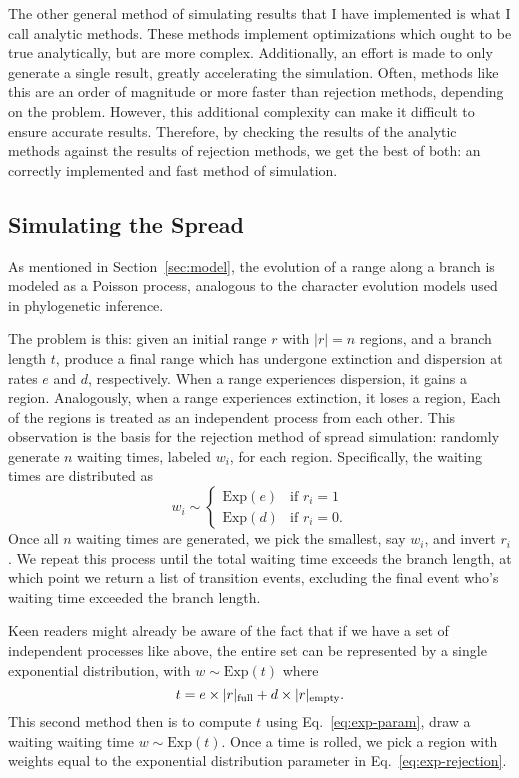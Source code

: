 \documentclass{article}
\begin{document}
The other general method of simulating results that I have implemented is what
I call analytic methods.
These methods implement optimizations which ought to be true analytically, but
are more complex.
Additionally, an effort is made to only generate a single result, greatly
accelerating the simulation.
Often, methods like this are an order of magnitude or more faster than
rejection methods, depending on the problem.
However, this additional complexity can make it difficult to ensure accurate
results.
Therefore, by checking the results of the analytic methods against the results
of rejection methods, we get the best of both: an correctly implemented and
fast method of simulation.

\subsection{Simulating the Spread}

As mentioned in Section~\ref{sec:model}, the evolution of a range along a
branch is modeled as a Poisson process, analogous to the character evolution
models used in phylogenetic inference.

The problem is this: given an initial range \( r \) with \( |r| = n \) regions,
and a branch length \( t \), produce a final range which has undergone
extinction and dispersion at rates \( e \) and \( d \), respectively.
When a range experiences dispersion, it gains a region.
Analogously, when a range experiences extinction, it loses a region, Each of
the regions is treated as an independent process from each other.
This observation is the basis for the rejection method of spread simulation:
randomly generate \( n \) waiting times, labeled \( w_i \), for each region.
Specifically, the waiting times are distributed as
\begin{equation}
	\label{eq:exp-rejection} w_i \sim
	\begin{cases}
		\text{Exp}(e) & \text{if } r_i
		= 1                            \\ \text{Exp}(d) & \text{if } r_i = 0.
	\end{cases}
\end{equation}
Once all $n$ waiting times are generated, we pick the smallest, say $w_i$, and
invert $r_i$.
We repeat this process until the total waiting time exceeds the branch length,
at which point we return a list of transition events, excluding the final event
who's waiting time exceeded the branch length.

Keen readers might already be aware of the fact that if we have a set of
independent processes like above, the entire set can be represented by a single
exponential distribution, with \(w \sim \text{Exp}(t) \) where
\begin{equation}
	\label{eq:exp-param} t = e \times |r|_\text{full} + d \times |r|_\text{empty}.
\end{equation}
This second method then is to compute \( t \) using Eq.~\ref{eq:exp-param},
draw a waiting waiting time \( w \sim \text{Exp}(t) \).
Once a time is rolled, we pick a region with weights equal to the exponential
distribution parameter in Eq.~\ref{eq:exp-rejection}.
\end{document}
